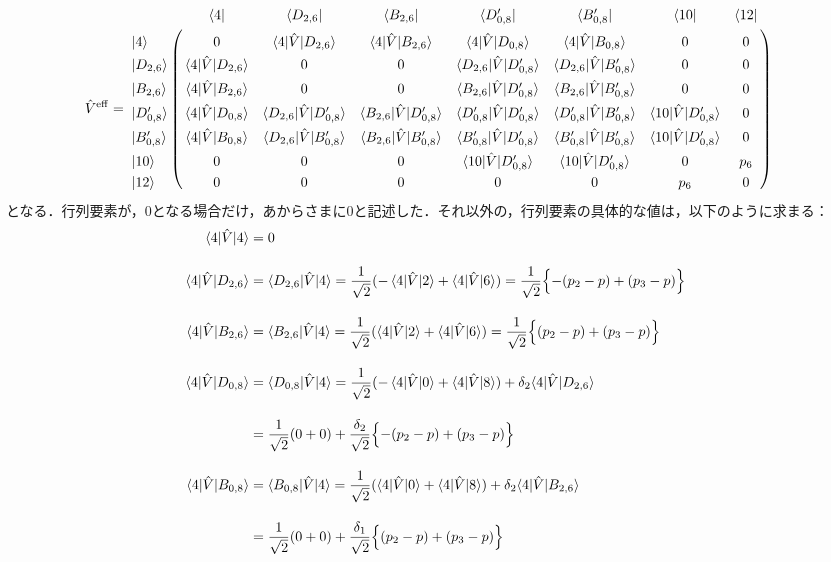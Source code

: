 \begin{align}
  \hat{V}^{\rm{eff}}&=
   \bordermatrix{     
    & \bra{4} &  \bra{D_{2,6}} &  \bra{B_{2,6}}&  \bra{D^\prime_{0,8}}&  \bra{B^\prime_{0,8}} &\bra{10} &\bra{12}\cr
   \ket{4}&0&\langle{4|\hat{V}|D_{2,6}}\rangle&\langle{4|\hat{V}|B_{2,6}}\rangle&\langle{4|\hat{V}|D_{0,8}}\rangle&\langle{4|\hat{V}|B_{0,8}}\rangle&0&0\cr
  \ket{D_{2,6}}&\langle{4|\hat{V}|D_{2,6}}\rangle&0&0&\langle{D_{2,6}|\hat{V}|D^\prime_{0,8}}\rangle&\langle{D_{2,6}|\hat{V}|B^\prime_{0,8}}\rangle&0&0\cr
  \ket{B_{2,6}}&\langle{4|\hat{V}|B_{2,6}}\rangle&0&0&\langle{B_{2,6}|\hat{V}|D^\prime_{0,8}}\rangle&\langle{B_{2,6}|\hat{V}|B^\prime_{0,8}}\rangle&0&0\cr
  \ket{D^\prime_{0,8}}&\langle{4|\hat{V}|D_{0,8}}\rangle&\langle{D_{2,6}|\hat{V}|D^\prime_{0,8}}\rangle&\langle{B_{2,6}|\hat{V}|D^\prime_{0,8}}\rangle& \langle{D^\prime_{0,8}|\hat{V}|D^\prime_{0,8}}\rangle& \langle{D^\prime_{0,8}|\hat{V}|B^\prime_{0,8}}\rangle&\langle{10|\hat{V}|D^\prime_{0,8}}\rangle&0\cr
  \ket{B^\prime_{0,8}}&\langle{4|\hat{V}|B_{0,8}}\rangle&\langle{D_{2,6}|\hat{V}|B^\prime_{0,8}}\rangle&\langle{B_{2,6}|\hat{V}|B^\prime_{0,8}}\rangle& \langle{B^\prime_{0,8}|\hat{V}|D^\prime_{0,8}}\rangle& \langle{B^\prime_{0,8}|\hat{V}|B^\prime_{0,8}}\rangle&\langle{10|\hat{V}|D^\prime_{0,8}}\rangle&0\cr
  \ket{10}&0&0&0&\langle{10|\hat{V}|D^\prime_{0,8}}\rangle&\langle{10|\hat{V}|D^\prime_{0,8}}\rangle&0&p_6\cr
  \ket{12}&0&0&0&0&0&p_6&0\cr}
\end{align}
となる．行列要素が，0となる場合だけ，あからさまに0と記述した．それ以外の，行列要素の具体的な値は，以下のように求まる：
\begin{align}
    \langle{4|\hat{V}|4}\rangle
    &=0\\[10pt]
    \langle{4|\hat{V}|D_{2,6}}\rangle
    &=\langle{D_{2,6}|\hat{V}|4}\rangle
    =\frac{1}{\sqrt{2}}(-\braket{4|\hat{V}|2} + \braket{4|\hat{V}|6})
    =\frac{1}{\sqrt{2}}\Bigl\{
    -(p_2-p) + (p_3-p)
    \Bigr\}\\[10pt]
    \langle{4|\hat{V}|B_{2,6}}\rangle
    &=\langle{B_{2,6}|\hat{V}|4}\rangle
    =\frac{1}{\sqrt{2}}(\braket{4|\hat{V}|2} + \braket{4|\hat{V}|6})
    =\frac{1}{\sqrt{2}}\Bigl\{
    (p_2-p) + (p_3-p)
    \Bigr\}\\[10pt]
    \langle{4|\hat{V}|D_{0,8}}\rangle
    &=\langle{D_{0,8}|\hat{V}|4}\rangle
    =\frac{1}{\sqrt{2}}(-\braket{4|\hat{V}|0} + \braket{4|\hat{V}|8})
    +\delta_2\langle{4|\hat{V}|D_{2,6}}\rangle\nn[10pt]
    &=\frac{1}{\sqrt{2}}(0+0)
    +\frac{\delta_2}{\sqrt{2}}\Bigl\{
    -(p_2-p) + (p_3-p)
    \Bigr\}\\[10pt]
   \langle{4|\hat{V}|B_{0,8}}\rangle
   &=\langle{B_{0,8}|\hat{V}|4}\rangle
   =\frac{1}{\sqrt{2}}(\braket{4|\hat{V}|0} + \braket{4|\hat{V}|8})
    +\delta_2\langle{4|\hat{V}|B_{2,6}}\rangle\nn[10pt]
    &=\frac{1}{\sqrt{2}}(0+0)
    +\frac{\delta_1}{\sqrt{2}}\Bigl\{
    (p_2-p) + (p_3-p)
    \Bigr\}\\[10pt]
\end{align}



